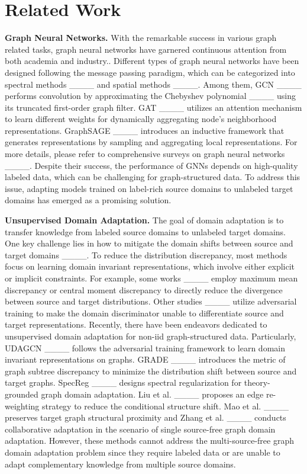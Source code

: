 \section{Related Work}
\textbf{Graph Neural Networks.} With the remarkable success in various graph related tasks, graph neural networks have garnered continuous attention from both academia and industry.. Different types of graph neural networks have been designed following the message passing paradigm, which can be categorized into spectral methods ____ and spatial methods ____. Among them, GCN ____ performs convolution by approximating the Chebyshev polynomial ____ using its truncated first-order graph filter. GAT ____ utilizes an attention mechanism to learn different weights for dynamically aggregating node's neighborhood representations. GraphSAGE ____ introduces an inductive framework that generates representations by sampling and aggregating local representations. For more details, please refer to comprehensive surveys on graph neural networks ____. Despite their success, the performance of GNNs depends on high-quality labeled data, which can be challenging for graph-structured data. To address this issue, adapting models trained on label-rich source domains to unlabeled target domains has emerged as a promising solution.

\textbf{Unsupervised Domain Adaptation.} The goal of domain adaptation is to transfer knowledge from labeled source domains to unlabeled target domains. One key challenge lies in how to mitigate the domain shifts between source and target domains ____. To reduce the distribution discrepancy, most methods focus on learning domain invariant representations, which involve either explicit or implicit constraints. For example, some works ____ employ maximum mean discrepancy or central moment discrepancy to directly reduce the divergence between source and target distributions. Other studies ____ utilize adversarial training to make the domain discriminator unable to differentiate source and target representations. Recently, there have been endeavors dedicated to unsupervised domain adaptation for non-iid graph-structured data. Particularly, UDAGCN ____ follows the adversarial training framework to learn domain invariant representations on graphs. GRADE ____ introduces the metric of graph subtree discrepancy to minimize the distribution shift between source and target graphs. SpecReg ____ designs spectral regularization for theory-grounded graph domain adaptation. Liu et al. ____ proposes an edge re-weighting strategy to reduce the conditional structure shift. Mao et al. ____ preserves target graph structural proximity and Zhang et al. ____ conducts collaborative adaptation in the scenario of single source-free graph domain adaptation. However, these methods cannot address the multi-source-free graph domain adaptation problem since they require labeled data or are unable to adapt complementary knowledge from multiple source domains.

